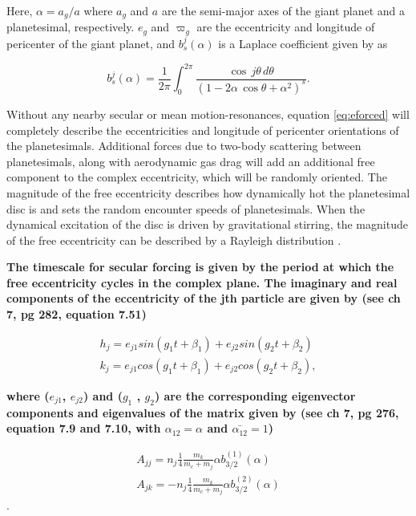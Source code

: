\documentclass[fleqn,usenatbib]{mnras}
\begin{document}
\noindent Here, $\alpha = a_{g} / a$ where $a_{g}$ and $a$ are the semi-major axes of the giant planet and a planetesimal, 
respectively. $e_{g}$ and $\varpi_{g}$ are the eccentricity and
longitude of pericenter of the giant planet, and $b^{j}_{s} (\alpha)$ is a 
Laplace coefficient given by \citep{1999ssd..book.....M} as

\begin{equation}\label{eq:lap}
	b_{s}^{j}(\alpha) = \frac{1}{2 \pi} \int_{0}^{2 \pi} \frac{\cos \, j \theta \, d \theta}{\left( 1 - 2 \alpha \, \cos \theta + \alpha^2 \right)^{s}}.
\end{equation}

Without any nearby secular or mean motion-resonances, equation \ref{eq:eforced} will completely describe the eccentricities and longitude of  
pericenter orientations of the planetesimals. Additional forces due to two-body scattering between planetesimals, along with 
aerodynamic gas drag will add an additional free component to the complex eccentricity, which will be randomly oriented. The 
magnitude of the free eccentricity describes how dynamically hot the planetesimal disc is and sets the random encounter speeds of 
planetesimals. When the dynamical excitation of the disc is driven by gravitational stirring, the magnitude of the free eccentricity can 
be described by a Rayleigh distribution \citep{1992Icar...96..107I}.

\textbf{The timescale for secular forcing is given by the period at which the free eccentricity cycles in the complex plane. The imaginary and real components of the eccentricity of the jth particle are given by \citet{1999ssd..book.....M} (see ch 7, pg 282, equation 7.51)}

\begin{eqnarray}\label{eq:kandh}
	h_{j} = e_{j1} sin (g_{1} t + \beta_{1}) + e_{j2} sin (g_{2} t + \beta_{2}) \\ \nonumber
	k_{j} = e_{j1} cos (g_{1} t + \beta_{1}) + e_{j2} cos (g_{2} t + \beta_{2}),
\end{eqnarray}

\noindent \textbf{where  ($e_{j1}$, $e_{j2}$) and ($g_{1}$ , $g_{2}$) are the corresponding eigenvector components and eigenvalues of the matrix given by \citet{1999ssd..book.....M} (see ch 7, pg 276, equation 7.9 and 7.10, with $\alpha_{12} = \alpha$ and $\bar{\alpha_{12}} = 1$)}

\begin{eqnarray}\label{eq:pert_matrix}
	A_{jj} = n_{j} \frac{1}{4} \frac{m_{k}}{m_{c} + m_{j}} \alpha b_{3/2}^{(1)} (\alpha) \\ \nonumber
	A_{jk} = -n_{j} \frac{1}{4} \frac{m_{k}}{m_{c} + m_{j}} \alpha b_{3/2}^{(2)} (\alpha)
\end{eqnarray}.
\end{document}

